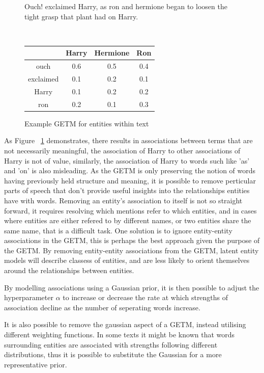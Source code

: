 \documentclass[10pt]{report}
\begin{document}
\begin{figure}[h!]

  \centering
  \begin{displayquote}
   Ouch! exclaimed Harry, as ron and hermione began to loosen the tight grasp that plant had on Harry.
    \end{displayquote}\\
    \begin{tabular}{c | c c c}
     &Harry&Hermione&Ron\\
      \hline
      ouch & 0.6 & 0.5  & 0.4 \\
      exclaimed & 0.1 & 0.2  & 0.1 \\
      Harry & 0.1 & 0.2  & 0.2 \\
      ron & 0.2 & 0.1  & 0.3 \\  
    \end{tabular} 
  \caption{ Example GETM for entities within text \label{fig:getm_example}}
\end{figure}

As Figure ~\ref{fig:getm_example} demonstrates, there results in associations between terms that are not necessarily meaningful, the association of Harry to other associations of Harry is not of value, similarly, the association of Harry to words such like 'as' and 'on' is also misleading. As the GETM is only preserving the notion of words having previously held structure and meaning, it is possible to remove perticular parts of speech that don't provide useful insights into the relationships entities have with words. Removing an entity's association to itself is not so straight forward, it requires resolving which mentions refer to which entities, and in cases where entities are either refered to by different names, or two entities share the same name, that is a difficult task. One solution is to ignore entity-entity associations in the GETM, this is perhaps the best approach given the purpose of the GETM. By removing entity-entity associations from the GETM, latent entity models will describe classess of entities, and are less likely to orient themselves around the relationships between entities.

By modelling associations using a Gaussian prior, it is then possible to adjust the hyperparameter \(\alpha\) to increase or decrease the rate at which strengths of association decline as the number of seperating words increase.

It is also possible to remove the gaussian aspect of a GETM, instead utilising different weighting functions. In some texts it might be known that words surrounding entities are associated with strengths following different distributions, thus it is possible to substitute the Gaussian for a more representative prior. 
\end{document}
